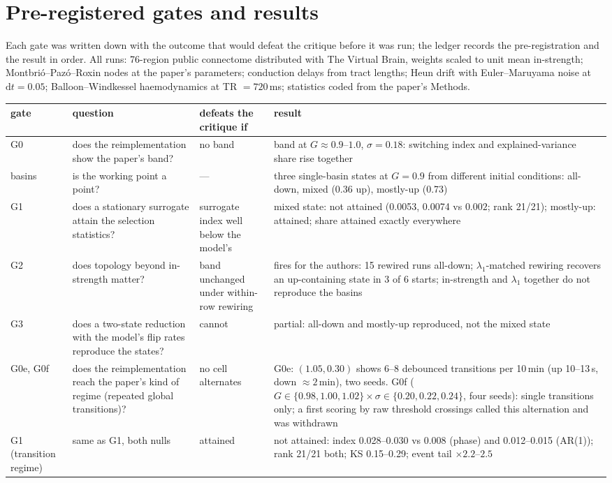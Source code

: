 \documentclass[11pt]{article}
\begin{document}
\section{Pre-registered gates and results}
Each gate was written down with the outcome that would defeat the critique before it was run; the ledger records the pre-registration and the result in order. All runs: 76-region public connectome distributed with The Virtual Brain, weights scaled to unit mean in-strength; Montbri\'o--Paz\'o--Roxin nodes at the paper's parameters; conduction delays from tract lengths; Heun drift with Euler--Maruyama noise at $\mathrm{d}t=0.05$; Balloon--Windkessel haemodynamics at TR $=720$\,ms; statistics coded from the paper's Methods.
\begin{center}\small
\begin{tabular}{@{}>{\raggedright\arraybackslash}p{1.5cm}>{\raggedright\arraybackslash}p{4.0cm}>{\raggedright\arraybackslash}p{3.4cm}>{\raggedright\arraybackslash}p{5.4cm}@{}}
\toprule
gate & question & defeats the critique if & result \\
\midrule
G0 & does the reimplementation show the paper's band? & no band & band at $G\approx0.9$--$1.0$, $\sigma=0.18$: switching index and explained-variance share rise together \\
basins & is the working point a point? & --- & three single-basin states at $G=0.9$ from different initial conditions: all-down, mixed (0.36 up), mostly-up (0.73) \\
G1 & does a stationary surrogate attain the selection statistics? & surrogate index well below the model's & mixed state: not attained (0.0053, 0.0074 vs $0.002$; rank 21/21); mostly-up: attained; share attained exactly everywhere \\
G2 & does topology beyond in-strength matter? & band unchanged under within-row rewiring & fires for the authors: 15 rewired runs all-down; $\lambda_1$-matched rewiring recovers an up-containing state in 3 of 6 starts; in-strength and $\lambda_1$ together do not reproduce the basins \\
G3 & does a two-state reduction with the model's flip rates reproduce the states? & cannot & partial: all-down and mostly-up reproduced, not the mixed state \\
G0e, G0f & does the reimplementation reach the paper's kind of regime (repeated global transitions)? & no cell alternates & G0e: $(1.05,0.30)$ shows 6--8 debounced transitions per 10\,min (up 10--13\,s, down $\approx 2$\,min), two seeds. G0f ($G\in\{0.98,1.00,1.02\}\times\sigma\in\{0.20,0.22,0.24\}$, four seeds): single transitions only; a first scoring by raw threshold crossings called this alternation and was withdrawn \\
G1 (transition regime) & same as G1, both nulls & attained & not attained: index 0.028--0.030 vs 0.008 (phase) and 0.012--0.015 (AR(1)); rank 21/21 both; KS 0.15--0.29; event tail $\times 2.2$--$2.5$ \\
\bottomrule
\end{tabular}
\end{center}

\printbibliography
\end{document}
